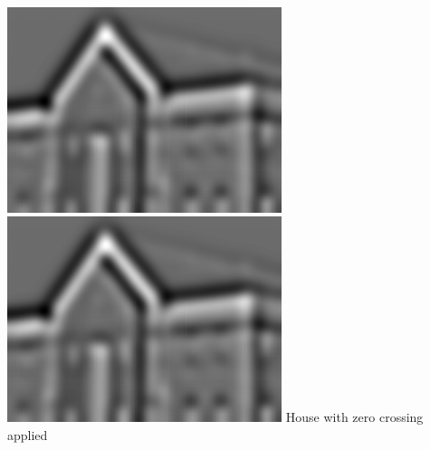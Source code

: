 \documentclass{article}
\begin{document}
\includegraphics[height=60mm]{laplace201}
\includegraphics[height=60mm]{laplace301}
\newpage
House with zero crossing applied
\end{document}
